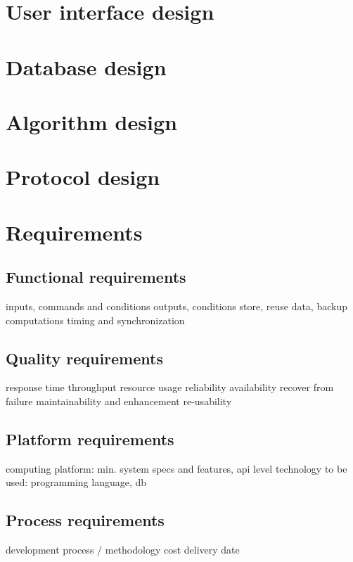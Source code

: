 \section{User interface design}

\section{Database design}

\section{Algorithm design}

\section{Protocol design}


\section{Requirements} %

\subsection{Functional requirements} %

inputs, commands and conditions
outputs, conditions
store, reuse data, backup
computations
timing and synchronization

\subsection{Quality requirements}

response time
throughput
resource usage
reliability
availability
recover from failure
maintainability and enhancement
re-usability

\subsection{Platform requirements}

computing platform: min. system specs and features, api level
technology to be used: programming language, db

\subsection{Process requirements}

development process / methodology
cost
delivery date
